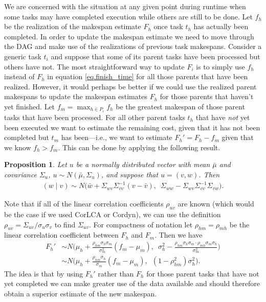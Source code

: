 \documentclass[12pt]{article}
\newtheorem{prop}[theorem]{Proposition}
\begin{document}
We are concerned with the situation at any given point during runtime when some tasks may have completed execution while others are still to be done. Let $f_h$ be the realization of the makespan estimate $F_h$ once task $t_h$ has actually been completed. In order to update the makespan estimate we need to move through the DAG and make use of the realizations of previous task makespans. Consider a generic task $t_i$ and suppose that some of its parent tasks have been processed but others have not. The most straightforward way to update $F_i$ is to simply use $f_h$ instead of $F_h$ in equation \eqref{eq.finish_time} for all those parents that have been realized. However, it would perhaps be better if we could use the realized parent makespans to update the makespan estimates $F_h$ for those parents that haven't yet finished. Let $f_m = \max_{h \in P_i} f_h$ be the greatest makespan of those parent tasks that have been processed. For all other parent tasks $t_h$ that have {\em not} yet been executed we want to estimate the remaining cost, given that it has not been completed but $t_m$ has been---i.e., we want to estimate $F_h' = F_h - f_m$ given that we know $f_h > f_m$. This can be done by applying the following result. 

\begin{prop}
	Let $u$ be a normally distributed vector with mean $\bar{\mu}$ and covariance $\Sigma_u$, $u \sim N(\bar{\mu}, \Sigma_u)$, and suppose that $u = (v, w)$. Then 
	\begin{align*}
	(w \mid v) \sim N \big( \bar{w} + \Sigma_{wv}\Sigma_{vv}^{-1} (v - \bar{v}), \enspace  \Sigma_{ww} - \Sigma_{wv} \Sigma_{vv}^{-1} \Sigma_{vw} \big).
	\end{align*}
\end{prop}
Note that if all of the linear correlation coefficients $\rho_{uv}$ are known (which would be the case if we used CorLCA or Cordyn), we can use the definition $\rho_{uv} = \Sigma_{uv} / \sigma_u \sigma_v$ to find $\Sigma_{uv}$. For compactness of notation let $\rho_{hm} = \rho_{mh}$ be the linear correlation coefficient between $F_h$ and $F_m$. Then we have 
\begin{align*}
F_h' &\sim N \bigg( \mu_{h} + \frac{\rho_{hm} \sigma_{h} \sigma_{m}}{\sigma_{m}^2} (f_m - \mu_{m}), \enspace \sigma_{h}^2 - \frac{\rho_{hm} \sigma_{h} \sigma_{m} \cdot \rho_{mh} \sigma_{m} \sigma_{h}}{\sigma_{m}^2} \bigg) \nonumber\\
&\sim N \bigg(\mu_{h} + \frac{\rho_{hm} \sigma_{h}}{\sigma_{m}} (f_m - \mu_{m}), \enspace (1 - \rho_{hm}^2) \sigma_{h}^2 \bigg).
\end{align*} 
The idea is that by using $F_h'$ rather than $F_h$ for those parent tasks that have not yet completed we can make greater use of the data available and should therefore obtain a superior estimate of the new makespan.  
\end{document}
